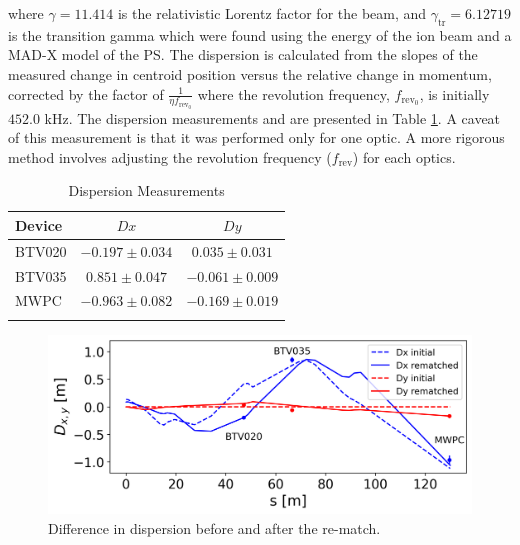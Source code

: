 \documentclass[a4paper,
               biblatex,     %
               ]{jacow}
\begin{document}
where $\gamma = 11.414$ is the relativistic Lorentz factor for the beam, and $\gamma_{\text{tr}} = 6.12719$ is the transition gamma which were found using the energy of the ion beam and a MAD-X model of the PS. The dispersion is calculated from the slopes of the measured change in centroid position versus the relative change in momentum, corrected by the factor of $\frac{1}{\eta f_{\text{rev}_0}}$ where the revolution frequency, $f_{\text{rev}_0}$, is initially $452.0$ kHz. The dispersion measurements and are presented in Table \ref{tab:dispersion}. A caveat of this measurement is that it was performed only for one optic. A more rigorous method involves adjusting the revolution frequency ($f_{\text{rev}}$) for each optics.


\begin{table}[h!]
\centering
\caption{Dispersion Measurements}
\begin{tabular}{l c c}
\hline
Device & \(Dx\) & \(Dy\) \\
\hline
BTV020  & \(-0.197 \pm 0.034\) & \(0.035 \pm 0.031\) \\
BTV035  & \(0.851 \pm 0.047\) & \(-0.061 \pm 0.009\) \\
MWPC   & \(-0.963 \pm 0.082\) & \(-0.169 \pm 0.019\) \\
\hline
\label{tab:dispersion}
\end{tabular}
\end{table}


\begin{figure}[!htb]
   \centering
   \includegraphics*[width=1.0\columnwidth]{dispersion_diff.png}
   \caption{Difference in dispersion before and after the re-match.}
   \label{fig:dispersion}
\end{figure}
\end{document}
